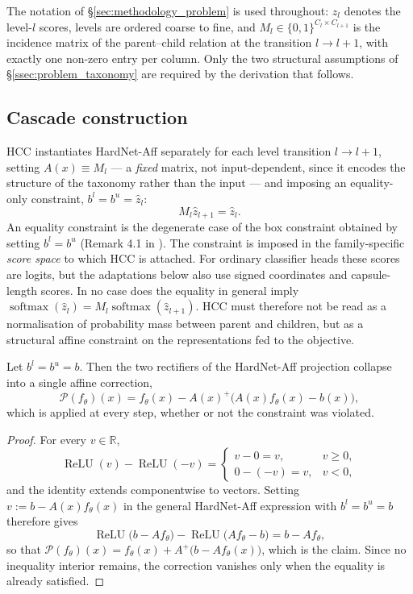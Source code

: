 The notation of \S\ref{sec:methodology_problem} is used throughout: $z_l$ denotes
the level-$l$ scores, levels are ordered coarse to fine, and
$M_l\in\{0,1\}^{C_l\times C_{l+1}}$ is the incidence matrix of the
parent--child relation at the transition $l\to l+1$, with exactly one non-zero
entry per column. Only the two
structural assumptions of \S\ref{ssec:problem_taxonomy} are required by the
derivation that follows.

\subsection{Cascade construction}
\label{ssec:hardnet_to_hcc}
\label{ssec:hcc_extensions}

HCC instantiates HardNet-Aff separately for each level transition $l\to l+1$,
setting $A(x)\equiv M_l$ --- a \emph{fixed} matrix, not input-dependent,
since it encodes the structure of the taxonomy rather than the input --- and
imposing an equality-only constraint, $b^l=b^u=\hat z_l$:
\[
M_l\hat z_{l+1}=\hat z_l .
\]
An equality constraint is the degenerate case of the box constraint obtained by
setting $b^l=b^u$ (Remark 4.1 in \cite{min2024hardnet}). The constraint is imposed
in the family-specific \emph{score space} to which HCC is attached. For ordinary
classifier heads these scores are logits, but the adaptations below also use
signed coordinates and capsule-length scores. In no case does the equality in
general imply
$\operatorname{softmax}(\hat z_l)=M_l\operatorname{softmax}(\hat z_{l+1})$.
HCC must therefore not be read as a normalisation of probability mass between
parent and children, but as a structural affine constraint on the representations
fed to the objective.

\begin{proposition}
\label{prop:hardnet_equality}
Let $b^{l}=b^{u}=b$. Then the two rectifiers of the HardNet-Aff projection collapse
into a single affine correction,
\[
\mathcal{P}(f_\theta)(x)
=
f_\theta(x)-A(x)^{+}\big(A(x)f_\theta(x)-b(x)\big),
\]
which is applied at every step, whether or not the constraint was violated.
\end{proposition}
\begin{proof}
For every $v\in\mathbb{R}$,
\[
\operatorname{ReLU}(v)-\operatorname{ReLU}(-v)
=
\begin{cases}
v-0=v, & v\ge 0,\\[0.4ex]
0-(-v)=v, & v<0,
\end{cases}
\]
and the identity extends componentwise to vectors. Setting
$v:=b-A(x)f_\theta(x)$ in the general HardNet-Aff expression with
$b^{l}=b^{u}=b$ therefore gives
\[
\operatorname{ReLU}\!\big(b-Af_\theta\big)-\operatorname{ReLU}\!\big(Af_\theta-b\big)
=
b-Af_\theta ,
\]
so that
$\mathcal{P}(f_\theta)(x)=f_\theta(x)+A^{+}\big(b-Af_\theta(x)\big)$, which is the
claim. Since no inequality interior remains, the correction vanishes only when
the equality is already satisfied.
\end{proof}

